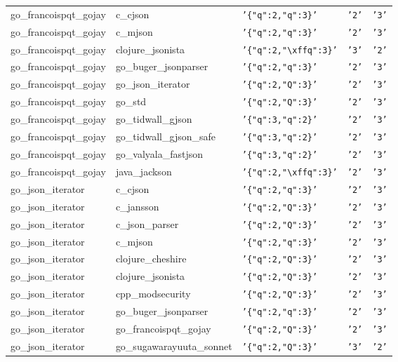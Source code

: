 \documentclass[english, 12pt, a4paper, sci, utf8, a-2b, online]{aaltothesis}
\def\str#1{\texttt{'#1'}}
\begin{document}
\begin{longtable}{lllll}
    go\_francoispqt\_gojay & c\_cjson & \str{\{"q":2,"q":3\}} & \str{2} & \str{3} \\
    go\_francoispqt\_gojay & c\_mjson & \str{\{"q":2,"q":3\}} & \str{2} & \str{3} \\
    go\_francoispqt\_gojay & clojure\_jsonista & \str{\{"q":2,"\textbackslash xffq":3\}} & \str{3} & \str{2} \\
    go\_francoispqt\_gojay & go\_buger\_jsonparser & \str{\{"q":2,"q":3\}} & \str{2} & \str{3} \\
    go\_francoispqt\_gojay & go\_json\_iterator & \str{\{"q":2,"Q":3\}} & \str{2} & \str{3} \\
    go\_francoispqt\_gojay & go\_std & \str{\{"q":2,"Q":3\}} & \str{2} & \str{3} \\
    go\_francoispqt\_gojay & go\_tidwall\_gjson & \str{\{"q":3,"q":2\}} & \str{2} & \str{3} \\
    go\_francoispqt\_gojay & go\_tidwall\_gjson\_safe & \str{\{"q":3,"q":2\}} & \str{2} & \str{3} \\
    go\_francoispqt\_gojay & go\_valyala\_fastjson & \str{\{"q":3,"q":2\}} & \str{2} & \str{3} \\
    go\_francoispqt\_gojay & java\_jackson & \str{\{"q":2,"\textbackslash xffq":3\}} & \str{2} & \str{3} \\
    go\_json\_iterator & c\_cjson & \str{\{"q":2,"q":3\}} & \str{2} & \str{3} \\
    go\_json\_iterator & c\_jansson & \str{\{"q":2,"Q":3\}} & \str{2} & \str{3} \\
    go\_json\_iterator & c\_json\_parser & \str{\{"q":2,"Q":3\}} & \str{2} & \str{3} \\
    go\_json\_iterator & c\_mjson & \str{\{"q":2,"q":3\}} & \str{2} & \str{3} \\
    go\_json\_iterator & clojure\_cheshire & \str{\{"q":2,"Q":3\}} & \str{2} & \str{3} \\
    go\_json\_iterator & clojure\_jsonista & \str{\{"q":2,"Q":3\}} & \str{2} & \str{3} \\
    go\_json\_iterator & cpp\_modsecurity & \str{\{"q":2,"Q":3\}} & \str{2} & \str{3} \\
    go\_json\_iterator & go\_buger\_jsonparser & \str{\{"q":2,"q":3\}} & \str{2} & \str{3} \\
    go\_json\_iterator & go\_francoispqt\_gojay & \str{\{"q":2,"Q":3\}} & \str{2} & \str{3} \\
    go\_json\_iterator & go\_sugawarayuuta\_sonnet & \str{\{"q":2,"Q":3\}} & \str{3} & \str{2} \\

\end{longtable}
\end{document}
